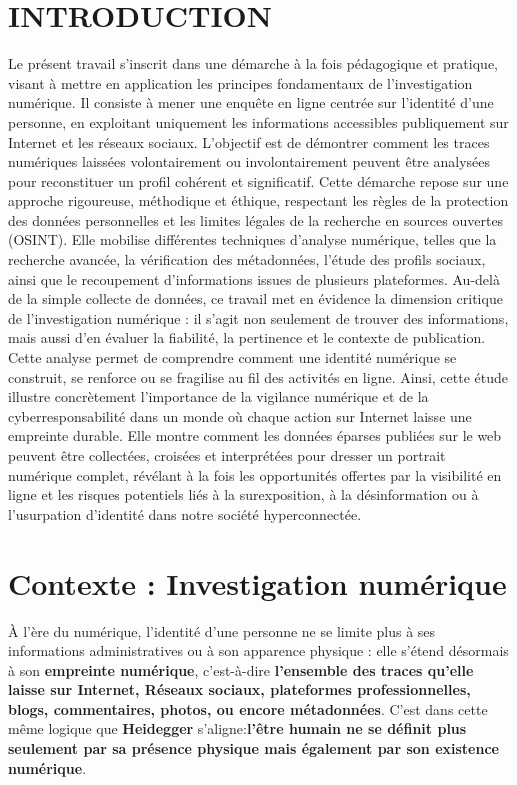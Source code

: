 \documentclass[memoire, 12pt]{report}
\begin{document}
\section*{INTRODUCTION}
Le présent travail s’inscrit dans une démarche à la fois pédagogique et pratique, visant à mettre en application les principes fondamentaux de l’investigation numérique. Il consiste à mener une enquête en ligne centrée sur l’identité d’une personne, en exploitant uniquement les informations accessibles publiquement sur Internet et les réseaux sociaux. L’objectif est de démontrer comment les traces numériques laissées volontairement ou involontairement peuvent être analysées pour reconstituer un profil cohérent et significatif. Cette démarche repose sur une approche rigoureuse, méthodique et éthique, respectant les règles de la protection des données personnelles et les limites légales de la recherche en sources ouvertes (OSINT). Elle mobilise différentes techniques d’analyse numérique, telles que la recherche avancée, la vérification des métadonnées, l’étude des profils sociaux, ainsi que le recoupement d’informations issues de plusieurs plateformes. Au-delà de la simple collecte de données, ce travail met en évidence la dimension critique de l’investigation numérique : il s’agit non seulement de trouver des informations, mais aussi d’en évaluer la fiabilité, la pertinence et le contexte de publication. Cette analyse permet de comprendre comment une identité numérique se construit, se renforce ou se fragilise au fil des activités en ligne. Ainsi, cette étude illustre concrètement l’importance de la vigilance numérique et de la cyberresponsabilité dans un monde où chaque action sur Internet laisse une empreinte durable. Elle montre comment les données éparses publiées sur le web peuvent être collectées, croisées et interprétées pour dresser un portrait numérique complet, révélant à la fois les opportunités offertes par la visibilité en ligne et les risques potentiels liés à la surexposition, à la désinformation ou à l’usurpation d’identité dans notre société hyperconnectée.



\newpage

\section{Contexte : Investigation numérique}  
À l’ère du numérique, l’identité d’une personne ne se limite plus à ses informations administratives ou à son apparence physique : elle s’étend désormais à son \textbf{empreinte numérique}, c’est-à-dire \textbf{l’ensemble des traces qu’elle laisse sur Internet, Réseaux sociaux, plateformes professionnelles, blogs, commentaires, photos, ou encore métadonnées}. C'est dans cette même logique que \textbf{Heidegger} s'aligne:\textbf{l’être humain ne se définit
plus seulement par sa présence physique mais également par son existence
numérique}. 
\end{document}
